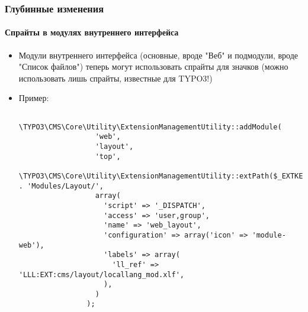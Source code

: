 \begin{frame}[fragile]
	\frametitle{Глубинные изменения}
	\framesubtitle{Спрайты в модулях внутреннего интерфейса}

	\lstset{basicstyle=\tiny\ttfamily}

	\begin{itemize}

		\item Модули внутреннего интерфейса (основные, вроде "Веб" и подмодули, вроде "Список файлов") 
		теперь могут использовать спрайты для значков\newline
			\small
				(можно использовать лишь спрайты, известные для TYPO3!)
			\normalsize

		\item Пример:

			\begin{lstlisting}
				\TYPO3\CMS\Core\Utility\ExtensionManagementUtility::addModule(
				  'web',
				  'layout',
				  'top',
				  \TYPO3\CMS\Core\Utility\ExtensionManagementUtility::extPath($_EXTKEY) . 'Modules/Layout/',
				  array(
				    'script' => '_DISPATCH',
				    'access' => 'user,group',
				    'name' => 'web_layout',
				    'configuration' => array('icon' => 'module-web'),
				    'labels' => array(
				      'll_ref' => 'LLL:EXT:cms/layout/locallang_mod.xlf',
				    ),
				  )
				);
			\end{lstlisting}

	\end{itemize}

\end{frame}


